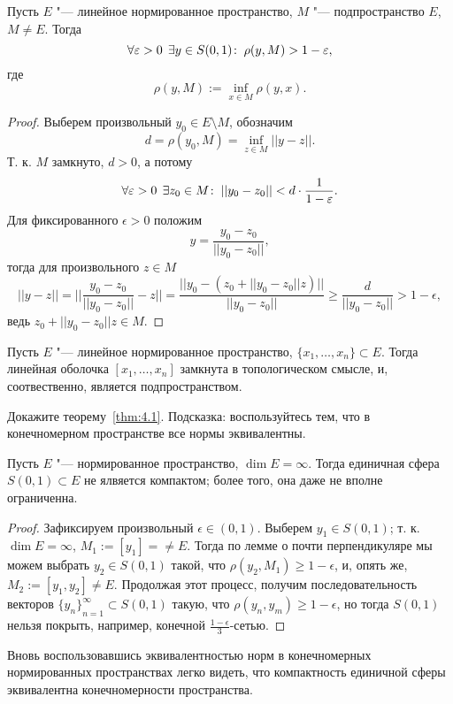 \documentclass[main]{subfiles}
\begin{document}
\begin{lemma}
  Пусть \( E \) "--- линейное нормированное пространство,
  \( M \) "--- подпространство \( E \),
  \( M \ne E \).
  Тогда
  \[
    \forall {\varepsilon> 0} \; \,
    \exists y \in S(0, 1) \colon \:
    \rho(y, M) > 1 - \varepsilon,
  \]
  где
  \[
    \rho(y, M) := \inf_{x \in M} \rho(y, x).
  \]
\end{lemma}
\begin{proof}
  Выберем произвольный \( y_0 \in E \setminus M \),
  обозначим \[ d = \rho(y_0, M) = \inf_{z \in M} ||y - z||. \]
  Т. к. \( M \) замкнуто, \( d > 0 \), а потому
  \[ \forall {\varepsilon> 0} \; \, \exists z_0 \in M \colon \: ||y_0 - z_0|| <
  d \cdot \frac{1}{1 - \varepsilon}. \]
  Для фиксированного \( \epsilon > 0 \)
  положим
  \[ y = \frac{y_0 - z_0}{||y_0 - z_0||}, \]
  тогда для произвольного \( z \in M \)
  \[
    ||y - z|| =
    ||\frac{y_0 - z_0}{||y_0 - z_0||} - z|| =
    \frac{
      ||y_0 - (z_0 + ||y_0 - z_0|| z)||
    }{||y_0 - z_0||}
  \ge \frac{d}{||y_0 - z_0||} > 1 - \epsilon, \]
  ведь \( z_0 + ||y_0 - z_0|| z \in M \).
\end{proof}

\begin{theorem}\label{thm:4.1}
  Пусть \( E \) "--- линейное нормированное пространство,
  \( \{ x_1, \dots, x_n \} \subset E \).
  Тогда линейная оболочка \( [x_1, \dots, x_n] \) замкнута в топологическом
  смысле, и, соотвественно, является подпространством.
\end{theorem}
\begin{exercise}
  Докажите теорему~\ref{thm:4.1}.
  Подсказка: воспользуйтесь тем, что в конечномерном пространстве
  все нормы эквивалентны.
\end{exercise}

\begin{theorem}[Ф. Рисс]\label{thm:sphere-compactness}
  Пусть \( E \) "--- нормированное пространство,
  \( \dim E = \infty \).
  Тогда единичная сфера \( S(0, 1) \subset E \)
  не ялвяется компактом; более того,
  она даже не вполне ограниченна.
\end{theorem}
\begin{proof}
  Зафиксируем произвольный \( \epsilon \in (0, 1) \).
  Выберем \( y_1 \in S(0, 1) \);
  т. к. \( \dim E = \infty \),
  \( M_1 := [y_1] = \ne E \).
  Тогда по лемме о почти перпендикуляре
  мы можем выбрать \( y_2 \in S(0, 1) \) такой,
  что \( \rho(y_2, M_1) \ge 1 - \epsilon \),
  и, опять же, \( M_2 := [y_1, y_2] \ne E \).
  Продолжая этот процесс, получим
  последовательность векторов
  \( {\{ y_n \}}_{n = 1}^\infty \subset S(0, 1) \)
  такую, что
  \( \rho(y_n, y_m) \ge 1 - \epsilon \),
  но тогда \( S(0, 1) \) нельзя покрыть,
  например,
  конечной \( \frac{1 - \epsilon}3 \)-сетью.
\end{proof}

\begin{remark}
  Вновь воспользовавшись эквивалентностью норм
  в конечномерных нормированных пространствах
  легко видеть, что
  компактность единичной сферы эквивалентна
  конечномерности пространства.
\end{remark}
\end{document}
